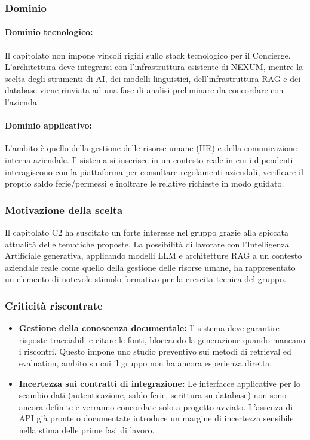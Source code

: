 \subsubsection{Dominio}
\paragraph{Dominio tecnologico:} Il capitolato non impone vincoli rigidi sullo stack tecnologico per il Concierge. L'architettura deve integrarsi con l'infrastruttura esistente di NEXUM, mentre la scelta degli strumenti di AI, dei modelli linguistici, dell'infrastruttura RAG e dei database viene rinviata ad una fase di analisi preliminare da concordare con l'azienda.
\paragraph{Dominio applicativo:} L'ambito è quello della gestione delle risorse umane (HR) e della comunicazione interna aziendale. Il sistema si inserisce in un contesto reale in cui i dipendenti interagiscono con la piattaforma per consultare regolamenti aziendali, verificare il proprio saldo ferie/permessi e inoltrare le relative richieste in modo guidato.

\subsubsection{Motivazione della scelta}
Il capitolato C2 ha suscitato un forte interesse nel gruppo grazie alla spiccata attualità delle tematiche proposte. La possibilità di lavorare con l'Intelligenza Artificiale generativa, applicando modelli LLM e architetture RAG a un contesto aziendale reale come quello della gestione delle risorse umane, ha rappresentato un elemento di notevole stimolo formativo per la crescita tecnica del gruppo.

\subsubsection{Criticità riscontrate}
\begin{itemize}
    \item \textbf{Gestione della conoscenza documentale:} Il sistema deve garantire risposte tracciabili e citare le fonti, bloccando la generazione quando mancano i riscontri. Questo impone uno studio preventivo sui metodi di retrieval ed evaluation, ambito su cui il gruppo non ha ancora esperienza diretta.
    \item \textbf{Incertezza sui contratti di integrazione:} Le interfacce applicative per lo scambio dati (autenticazione, saldo ferie, scrittura su database) non sono ancora definite e verranno concordate solo a progetto avviato. L'assenza di API già pronte o documentate introduce un margine di incertezza sensibile nella stima delle prime fasi di lavoro.
\end{itemize}

